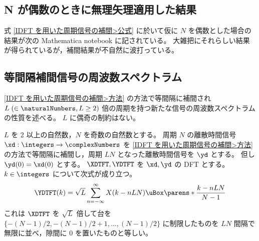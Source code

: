         \subsection{N が偶数のときに無理矢理適用した結果}
            \label{N が偶数のときに無理矢理適用した結果}
            式 \eqref{IDFT を用いた周期信号の補間>公式} に於いて仮に $N$ を偶数とした場合の結果が次の Mathematica notebook に記されている。
            大雑把にそれらしい結果が得られているが，補間結果が不自然に波打っている。\newline
            \href{\currfiledir/calc/Interpolation_with_IDFT/interpolation_with_IDFT_N=even/interpolation_with_IDFT_N=even.nb}{}
        \subsection{等間隔補間信号の周波数スペクトラム}
            \ref{IDFT を用いた周期信号の補間>方法} の方法で等間隔に補間され $L\;(\in\naturalNumbers,L\geq 2)$ 倍の周期を持つ新たな信号の周波数スペクトラムの性質を述べる。
            $L$ に偶奇の制約はない。
            \begin{shadebox}
                $L$ を 2 以上の自然数，$N$ を奇数の自然数とする。
                周期 $N$ の離散時間信号 $\xd:\integers\to\complexNumbers$ を \ref{IDFT を用いた周期信号の補間>方法} の方法で等間隔に補間し，周期 $LN$ となった離散時間信号を $\yd$ とする。
                但し $\yd(0) = \xd(0)$ とする。
                $\XDTFT,\YDTFT$ を $\xd,\yd$ の DFT とする。$k\in\integers$ について次式が成り立つ。
                \[ \YDTFT(k) = \sqrt{L}\sum_{n=-\infty}^{\infty}X(k-nLN)\uBox\parens*{\frac{k-nLN}{N-1}} \]
                これは $\XDTFT$ を $\sqrt{L}$ 倍して台を $\{-(N-1)/2,-(N-1)/2+1,\dots,(N-1)/2\}$ に制限したものを $LN$ 間隔で無限に並べ，隙間に 0 を置いたものと等しい。
            \end{shadebox}
